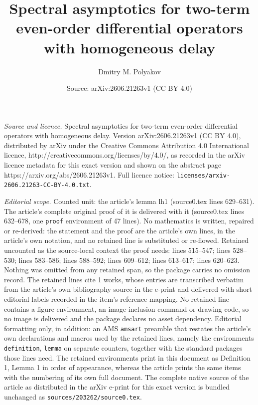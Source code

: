 \documentclass[10pt,a4paper]{amsart}
\title{Spectral asymptotics for two-term even-order differential operators with homogeneous delay}
\author{Dmitry M. Polyakov}
\date{Source: arXiv:2606.21263v1 (CC BY 4.0)}
\begin{document}
\maketitle

\noindent\emph{Source and licence.} Spectral asymptotics for two-term even-order differential operators with homogeneous delay. Version arXiv:2606.21263v1 (CC BY 4.0), distributed by arXiv under the Creative Commons Attribution 4.0 International licence, http://creativecommons.org/licenses/by/4.0/, as recorded in the arXiv licence metadata for this exact version and shown on the abstract page https://arxiv.org/abs/2606.21263v1. Full licence notice: \texttt{licenses/arxiv-2606.21263-CC-BY-4.0.txt}.\par\smallskip

\noindent\textit{Editorial scope.} Counted unit: the article's lemma lh1 (source0.tex lines 629--631). The article's complete original proof of it is delivered with it (source0.tex lines 632--678, one \texttt{proof} environment of 47 lines). No mathematics is written, repaired or re-derived: the statement and the proof are the article's own lines, in the article's own notation, and no retained line is substituted or re-flowed.  Retained uncounted as the source-local context the proof needs: lines 515--547; lines 528--530; lines 583--586; lines 588--592; lines 609--612; lines 613--617; lines 620--623.  Nothing was omitted from any retained span, so the package carries no omission record.  The retained lines cite 1 works, whose entries are transcribed verbatim from the article's own bibliography source in the e-print and delivered with short editorial labels recorded in the item's reference mapping.  No retained line contains a figure environment, an image-inclusion command or drawing code, so no image is delivered and the package declares no asset dependency.  Editorial formatting only, in addition: an AMS \texttt{amsart} preamble that restates the article's own declarations and macros used by the retained lines, namely the environments \texttt{definition}, \texttt{lemma} on separate counters, together with the standard packages those lines need.  The retained environments print in this document as Definition 1, Lemma 1 in order of appearance, whereas the article prints the same items with the numbering of its own full document.  The complete native source of the article as distributed in the arXiv e-print for this exact version is bundled unchanged as \texttt{sources/203262/source0.tex}.
\end{document}
